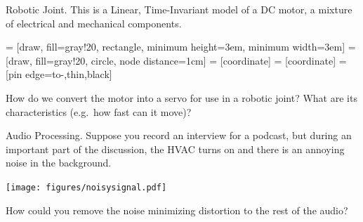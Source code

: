 \begin{example} Robotic Joint. This is a Linear, Time-Invariant model of a DC motor, a mixture of electrical and mechanical components.

  \begin{center}
     = [draw, fill=gray!20, rectangle, 
      minimum height=3em, minimum width=3em]
     = [draw, fill=gray!20, circle, node distance=1cm]
     = [coordinate]
     = [coordinate]
     = [pin edge={to-,thin,black}]

  \end{center}
  
  How do we convert the motor into a servo for use in a robotic joint? What are its characteristics (e.g.\ how fast can it move)?
\end{example}

\begin{example} Audio Processing. Suppose you record an interview for a podcast, but during an important part of the discussion, the HVAC turns on and there is an annoying noise in the background.

  \begin{center}
    \texttt{[image: figures/noisysignal.pdf]}
  \end{center}

  How could you remove the noise minimizing distortion to the rest of the audio?
\end{example}


